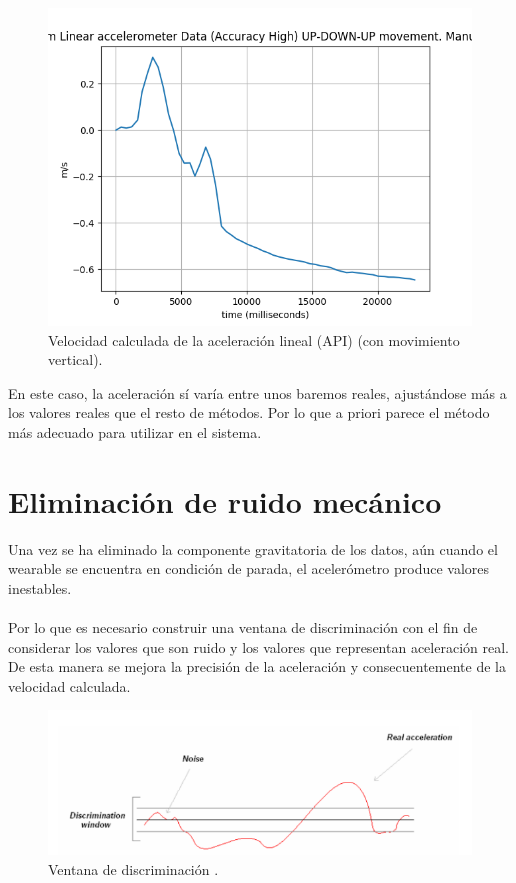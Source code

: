 \begin{figure}[H]
	\centering
	\includegraphics[scale=0.5]{imagenes/linearGoogleup-downSpeed.png}
	\caption{Velocidad calculada de la aceleración lineal (API) (con movimiento vertical).}
	\label{Velocidad vertical aceleracion lineal}
\end{figure}
\noindent
En este caso, la aceleración sí varía entre unos baremos reales, ajustándose más a los valores reales que el resto de métodos. Por lo que a priori parece el método más adecuado para utilizar en el sistema.

\section{Eliminación de ruido mecánico}

Una vez se ha eliminado la componente gravitatoria de los datos, aún cuando el wearable se encuentra en condición de parada, el acelerómetro produce valores inestables.
\\
\\
Por lo que es necesario construir una ventana de discriminación con el fin de considerar los valores que son ruido y los valores que representan aceleración real. De esta manera se mejora la precisión de la aceleración y consecuentemente de la velocidad calculada.
\\
\begin{figure}[H]
	\centering
	\includegraphics[scale=0.5]{imagenes/ventana.png}
	\caption{Ventana de discriminación \cite{nxp}.}
	\label{Ventana de discriminación}
\end{figure}
